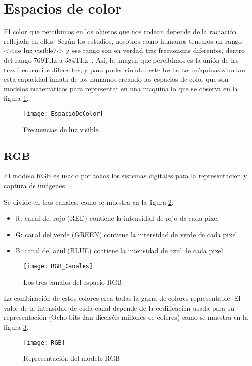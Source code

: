 \section{Espacios de color }
El color que percibimos en los objetos que nos rodean depende de la radiación reflejada en ellos. Según los estudios, nosotros como humanos tenemos un rango <<de luz visible>> y ese rango son en verdad tres frecuencias diferentes, dentro del rango 769THz a 384THz~\cite{Manual:HAE}.
Así, la imagen que percibimos es la unión de las tres frecuencias diferentes, y para poder simular este hecho las máquinas simulan esta capacidad innata de los humanos creando los espacios de color que son modelos matemáticos para representar en una maquina lo que se observa en la figura \ref{fig:3.1}.

\begin{figure}[h]
\centering
\texttt{[image: EspacioDeColor]}
\caption{Frecuencias de luz visible \cite{Manual:HAE}}
\label{fig:3.1}
\end{figure}

\subsection{RGB}
El modelo RGB es usado por todos los sistemas digitales para la representación y captura de imágenes.

Se divide en tres canales, como se muestra en la figura \ref{fig:3.2}.

\begin{itemize}
	\item R: canal del rojo (RED) contiene la intensidad de rojo de cada pixel
	\item G: canal del verde (GREEN) contiene la intensidad de verde de cada pixel
	\item B: canal del azul (BLUE) contiene la intensidad de azul de cada pixel
\end{itemize}

\begin{figure}[h]
\centering
\texttt{[image: RGB\_Canales]}
\caption{Los tres canales del espacio RGB~\cite{Manual:HAE}}
\label{fig:3.2}
\end{figure}
La combinación de estos colores crea todas la gama de colores representable.
El valor de la intensidad de cada canal depende de la codificación usada para su representación (Ocho bits dan dieciséis millones de colores) como se muestra en la figura  \ref{fig:3.3}.

\begin{figure}[h]
\centering
\texttt{[image: RGB]}
\caption{Representación del modelo RGB~\cite{Manual:HAE}}
\label{fig:3.3}
\end{figure}

